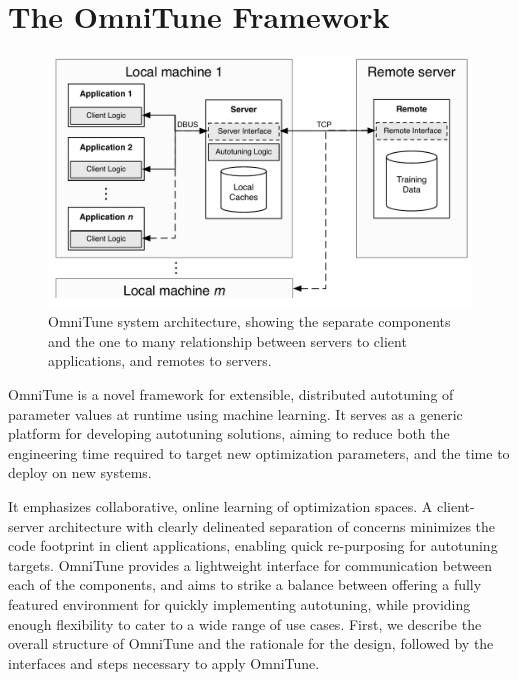 \documentclass[nonatbib,preprint,nocopyrightspace,9pt]{sigplanconf}
\begin{document}
  \section{The OmniTune Framework}\label{sec:autotune}

  \begin{figure}
    \centering
    \includegraphics[width=.98\columnwidth]{img/omnitune-system-overview.pdf}
    \caption{%
    OmniTune system architecture, showing the separate components and the one to
    many relationship between servers to client applications, and remotes to
    servers.
    \vspace{-1em}%
    }
    \label{fig:omnitune-system-overview}
  \end{figure}

  OmniTune is a novel framework for extensible, distributed autotuning of
  parameter values at runtime using machine learning. It serves as a generic
  platform for developing autotuning solutions, aiming to reduce both the
  engineering time required to target new optimization parameters, and the time to
  deploy on new systems.

  It emphasizes collaborative, online learning of optimization spaces. A client-
  server architecture with clearly delineated separation of concerns minimizes the
  code footprint in client applications, enabling quick re-purposing for
  autotuning targets. OmniTune provides a lightweight interface for communication
  between each of the components, and aims to strike a balance between offering a
  fully featured environment for quickly implementing autotuning, while providing
  enough flexibility to cater to a wide range of use cases. First, we describe the
  overall structure of OmniTune and the rationale for the design, followed by the
  interfaces and steps necessary to apply OmniTune.
\end{document}
